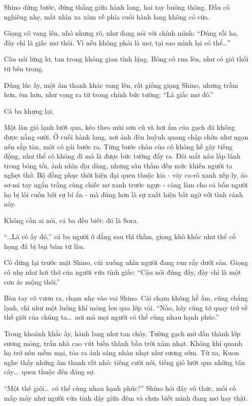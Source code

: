 \documentclass[../main.tex]{subfiles}
\begin{document}
Shino dừng bước, đứng thẳng giữa hành lang, hai tay buông thõng. Đầu cô nghiêng nhẹ, mắt nhìn xa xăm về phía cuối hành lang không có cửa.

Giọng cô vang lên, nhỏ nhưng rõ, như đang nói với chính mình: ``Đúng rồi ha, đây chỉ là giấc mơ thôi. Vì nếu không phải là mơ, tại sao mình lại có thể\dots''

Câu nói lửng lơ, tan trong không gian tĩnh lặng. Bóng cô run lên, như có gió thổi từ bên trong.

Đúng lúc ấy, một âm thanh khác vang lên, rất giống giọng Shino, nhưng trầm hơn, êm hơn, như vọng ra từ trong chính bức tường: ``Là giấc mơ đó.''

Cả ba khựng lại.

Một làn gió lạnh lướt qua, kéo theo mùi sơn cũ và hơi ẩm của gạch đá không được nắng sưởi. Ở cuối hành lang, nơi ánh đèn huỳnh quang chập chờn như ngọn nến sắp tàn, một cô gái bước ra. Từng bước chân của cô không hề gây tiếng động, như thể cô không đi mà là được bức tường đẩy ra. Đôi mắt nâu lấp lánh trong bóng tối, ánh nhìn dịu dàng, nhưng sâu thẳm đến mức khiến người ta nghẹt thở. Bộ đồng phục thời hiện đại quen thuộc kia - váy ca-rô xanh xếp ly, áo sơ-mi tay ngắn trắng cùng chiếc nơ xanh trước ngực - càng làm cho cả bốn người họ bị lôi cuốn bởi sự bí ẩn - mà đúng hơn là sự xuất hiện bất ngờ với tình cảnh này.

Không cần ai nói, cả ba đều biết: đó là Sora.


``\dots Là cô ấy đó,'' cả ba người ở đằng sau thì thầm, giọng khô khốc như thể cổ họng đã bị bụi bám từ lâu.

Cô dừng lại trước mặt Shino, cúi xuống nhìn người đang run rẩy dưới sàn. Giọng cô nhẹ như hơi thở của người vừa tỉnh giấc: ``Cậu nói đúng đấy, đây chỉ là một cơn ác mộng thôi.''

Bàn tay cô vươn ra, chạm nhẹ vào vai Shino. Cái chạm không hề ấm, cũng chẳng lạnh, chỉ như một luồng khí mỏng len qua lớp vải. ``Nào, hãy cùng tớ quay trở về thế giới của chúng ta\dots\ nơi mà mọi người có thể cùng nhau hạnh phúc.''

Trong khoảnh khắc ấy, hành lang như tan chảy. Tường gạch mờ dần thành lớp sương mỏng, trần nhà cao vút biến thành bầu trời xám nhạt. Không khí quanh họ trở nên mềm mại, tỏa ra ánh sáng nhàn nhạt như sương sớm. Từ xa, Kuon nghe thấy những âm thanh rất nhỏ: tiếng cười nói, tiếng gió lướt qua những tán cây\dots\ quen thuộc đến đáng sợ.

``Một thế giói\dots\ có thể cùng nhau hạnh phúc?'' Shino hỏi đây vô thức, môi cô mấp máy như người vừa tỉnh dậy giữa đêm và chưa biết mình đang mơ hay thật.
\end{document}
